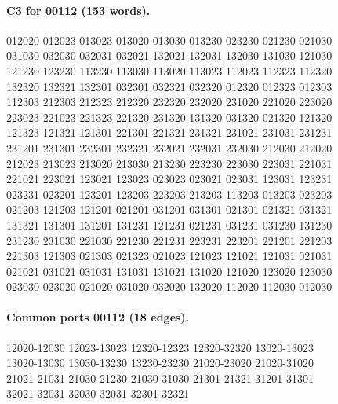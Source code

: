 \documentclass[11pt]{article}
\theoremstyle{remark}
\numberwithin{equation}{section}
\numberwithin{table}{section}
\begin{document}
\paragraph{C3 for 00112 (153 words).}
\begingroup\small\ttfamily\begin{flushleft}
012020 012023 013023 013020 013030 013230 023230 021230 021030\\
031030 032030 032031 032021 132021 132031 132030 131030 121030\\
121230 123230 113230 113030 113020 113023 112023 112323 112320\\
132320 132321 132301 032301 032321 032320 012320 012323 012303\\
112303 212303 212323 212320 232320 232020 231020 221020 223020\\
223023 221023 221323 221320 231320 131320 031320 021320 121320\\
121323 121321 121301 221301 221321 231321 231021 231031 231231\\
231201 231301 232301 232321 232021 232031 232030 212030 212020\\
212023 213023 213020 213030 213230 223230 223030 223031 221031\\
221021 223021 123021 123023 023023 023021 023031 123031 123231\\
023231 023201 123201 123203 223203 213203 113203 013203 023203\\
021203 121203 121201 021201 031201 031301 021301 021321 031321\\
131321 131301 131201 131231 121231 021231 031231 031230 131230\\
231230 231030 221030 221230 221231 223231 223201 221201 221203\\
221303 121303 021303 021323 021023 121023 121021 121031 021031\\
021021 031021 031031 131031 131021 131020 121020 123020 123030\\
023030 023020 021020 031020 032020 132020 112020 112030 012030\\
\end{flushleft}\endgroup
\paragraph{Common ports 00112 (18 edges).}
\begingroup\small\ttfamily\begin{flushleft}
12020-12030 12023-13023 12320-12323 12320-32320 13020-13023\\
13020-13030 13030-13230 13230-23230 21020-23020 21020-31020\\
21021-21031 21030-21230 21030-31030 21301-21321 31201-31301\\
32021-32031 32030-32031 32301-32321\\
\end{flushleft}\endgroup
\end{document}
